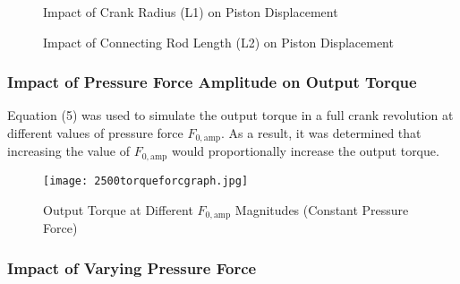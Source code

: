 \documentclass[12pt]{article}
\begin{document}
\begin{figure}[H]
    \centering
    \caption{Impact of Crank Radius (L1) on Piston Displacement}
    \label{fig:l1_effect}
\end{figure}

\begin{figure}[H]
    \centering
    \caption{Impact of Connecting Rod Length (L2) on Piston Displacement}
    \label{fig:l2_effect}
\end{figure}

\subsubsection{Impact of Pressure Force Amplitude on Output Torque}

Equation (5) was used to simulate the output torque in a full crank revolution at different values of pressure force \(F_{0,\text{amp}}\). As a result, it was determined that increasing the value of \(F_{0,\text{amp}}\) would proportionally increase the output torque. 

\begin{figure}[H]
    \centering
    \texttt{[image: 2500torqueforcgraph.jpg]}
    \caption{Output Torque at Different \(F_{0,\text{amp}}\) Magnitudes (Constant Pressure Force)}
    \label{fig:f0_amp_torque}
\end{figure}

\subsubsection{Impact of Varying Pressure Force}
\end{document}

